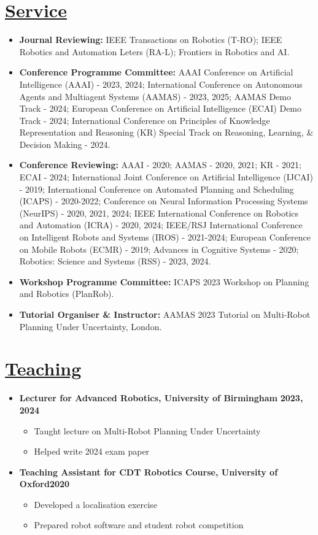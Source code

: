 \documentclass[11pt]{article}
\begin{document}
\section*{\underline{Service}}
\begin{itemize}
\item \textbf{Journal Reviewing:} IEEE Transactions on Robotics (T-RO); IEEE Robotics and Automation Leters (RA-L); Frontiers in Robotics and AI.
\item \textbf{Conference Programme Committee:}  AAAI Conference on Artificial Intelligence (AAAI) - 2023, 2024; International Conference on Autonomous Agents and Multiagent Systems (AAMAS) - 2023, 2025; AAMAS Demo Track - 2024; European Conference on Artificial Intelligence (ECAI) Demo Track - 2024; International Conference on Principles of Knowledge Representation and Reasoning (KR) Special Track on Reasoning, Learning, \& Decision Making - 2024.
\item \textbf{Conference Reviewing:} AAAI - 2020; AAMAS - 2020, 2021; KR - 2021; ECAI - 2024; International Joint Conference on Artificial Intelligence (IJCAI) - 2019; International Conference on Automated Planning and Scheduling (ICAPS) - 2020-2022; Conference on Neural Information Processing Systems (NeurIPS) - 2020, 2021, 2024; IEEE International Conference on Robotics and Automation (ICRA) - 2020, 2024; IEEE/RSJ International Conference on Intelligent Robots and Systems (IROS) - 2021-2024; European Conference on Mobile Robots (ECMR) - 2019; Advances in Cognitive Systems - 2020;  Robotics: Science and Systems (RSS) - 2023, 2024.
\item\textbf{Workshop Programme Committee:} ICAPS 2023 Workshop on Planning and Robotics (PlanRob).
\item \textbf{Tutorial Organiser \& Instructor:} AAMAS 2023 Tutorial on Multi-Robot Planning Under Uncertainty, London.
\end{itemize}

\section*{\underline{Teaching}}
\begin{itemize}
\item \textbf{Lecturer for Advanced Robotics, University of Birmingham} \hfill  \textbf{2023,\,2024}
\begin{itemize}
\item Taught lecture on Multi-Robot Planning Under Uncertainty
\item Helped write 2024 exam paper
\end{itemize}
\item \textbf{Teaching Assistant for CDT Robotics Course, University of Oxford}\hfill \textbf{2020}
\begin{itemize}
\item Developed a localisation exercise
\item Prepared robot software and student robot competition
\end{itemize}
\end{itemize}
\end{document}
